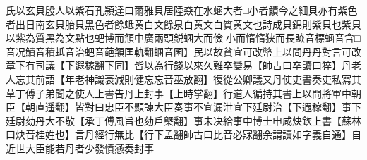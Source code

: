 氏以玄貝殷人以紫石孔頴達曰爾雅貝居陸猋在水蜬大者□小者鰿今之細貝亦有紫色者出日南玄貝胎貝黑色者餘蚳黄白文餘泉白黄文白質黄文也詩成貝錦則紫貝也紫貝以紫為質黑為文點也蚆博而頯中廣兩頭鋭蜠大而儉小而惰惰狭而長贆音標蜬音含□音况鰿音積蚳音治蚆音葩頯匡軌翻蜠音囷】民以故貧宜可改幣上以問丹丹對言可改章下有司議【下遐稼翻下同】皆以為行錢以來久難卒變易【師古曰卒讀曰猝】丹老人忘其前語【年老神識衰減則健忘忘音巫放翻】復從公卿議又丹使吏書奏吏私寫其草丁傅子弟聞之使人上書告丹上封事【上時掌翻】行道人徧持其書上以問將軍中朝臣【朝直遥翻】皆對曰忠臣不顯諫大臣奏事不宜漏泄宜下廷尉治【下遐稼翻】事下廷尉劾丹大不敬【承丁傅風旨也劾戶槩翻】事未决給事中博士申咸炔欽上書【蘇林曰炔音桂姓也】言丹經行無比【行下孟翻師古曰比音必寐翻余謂讀如字義自通】自近世大臣能若丹者少發憤懣奏封事